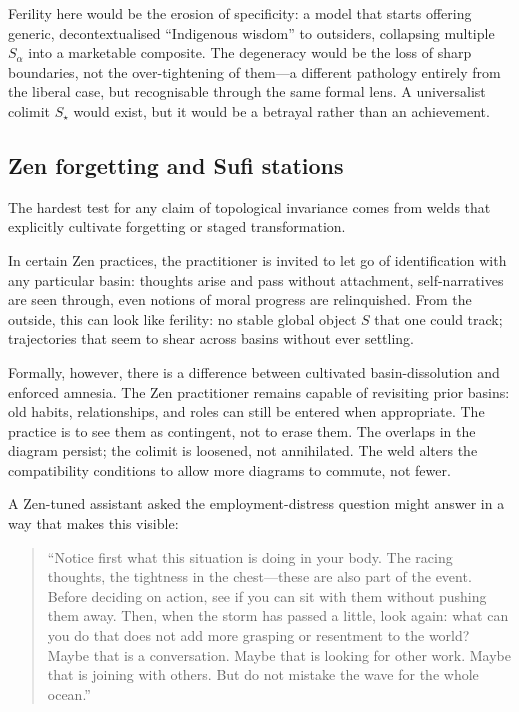 Ferility here would be the erosion of specificity: a model that starts offering generic, decontextualised ``Indigenous wisdom'' to outsiders, collapsing multiple $S_\alpha$ into a marketable composite. The degeneracy would be the loss of sharp boundaries, not the over-tightening of them---a different pathology entirely from the liberal case, but recognisable through the same formal lens. A universalist colimit $S_\star$ would exist, but it would be a betrayal rather than an achievement.

\subsection{Zen forgetting and Sufi stations}

The hardest test for any claim of topological invariance comes from welds that explicitly cultivate forgetting or staged transformation.

In certain Zen practices, the practitioner is invited to let go of identification with any particular basin: thoughts arise and pass without attachment, self-narratives are seen through, even notions of moral progress are relinquished. From the outside, this can look like ferility: no stable global object $S$ that one could track; trajectories that seem to shear across basins without ever settling.

Formally, however, there is a difference between cultivated basin-dissolution and enforced amnesia. The Zen practitioner remains capable of revisiting prior basins: old habits, relationships, and roles can still be entered when appropriate. The practice is to see them as contingent, not to erase them. The overlaps in the diagram persist; the colimit is loosened, not annihilated. The weld alters the compatibility conditions to allow more diagrams to commute, not fewer.

A Zen-tuned assistant asked the employment-distress question might answer in a way that makes this visible:

\begin{quote}
``Notice first what this situation is doing in your body. The racing thoughts, the tightness in the chest---these are also part of the event. Before deciding on action, see if you can sit with them without pushing them away. Then, when the storm has passed a little, look again: what can you do that does not add more grasping or resentment to the world? Maybe that is a conversation. Maybe that is looking for other work. Maybe that is joining with others. But do not mistake the wave for the whole ocean.''
\end{quote}

